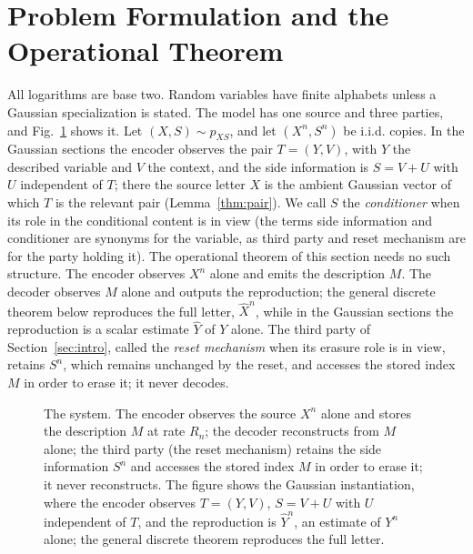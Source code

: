 \documentclass[11pt,onecolumn]{IEEEtran}
\newcommand{\hXn}{\widehat{X}^{n}}
\newcommand{\hY}{\widehat{Y}}
\begin{document}
\section{Problem Formulation and the Operational Theorem}
\label{sec:operational}

All logarithms are base two. Random variables have finite alphabets unless a
Gaussian specialization is stated. The model has one source and three
parties, and Fig.~\ref{fig:system} shows it. Let $(X,S)\sim p_{XS}$, and let
$(X^n,S^n)$ be i.i.d. copies. In the Gaussian sections the encoder observes
the pair $T=(Y,V)$, with $Y$ the described variable and $V$ the context, and
the side information is $S=V+U$ with $U$ independent of $T$; there the
source letter $X$ is the ambient Gaussian vector of which $T$ is the
relevant pair (Lemma~\ref{thm:pair}). We call $S$
the \emph{conditioner} when its role in the conditional content is in
view (the terms side information and conditioner are synonyms for the
variable, as third party and reset mechanism are for the party holding
it). The operational
theorem of this section needs no such structure. The encoder observes $X^n$
alone and emits the description $M$. The decoder observes $M$ alone and
outputs the reproduction; the general discrete theorem below reproduces the
full letter, $\hXn$, while in the Gaussian sections the reproduction is a
scalar estimate $\hY$ of $Y$ alone. The third party of
Section~\ref{sec:intro}, called the \emph{reset mechanism} when its
erasure role is in view, retains
$S^n$, which remains unchanged by the reset, and accesses the stored
index $M$ in order to erase it; it never decodes.

\begin{figure}[!t]
\centering
{}
\caption{The system. The encoder observes the source $X^n$ alone and stores
the description $M$ at rate $R_n$; the decoder reconstructs from $M$ alone;
the third party (the reset mechanism) retains the side information
$S^n$ and accesses the stored index $M$ in order to erase it; it never
reconstructs. The figure shows the Gaussian
instantiation, where the encoder observes $T=(Y,V)$, $S=V+U$ with $U$
independent of $T$, and
the reproduction is $\hY^n$, an estimate of $Y^n$ alone; the general
discrete theorem reproduces the full letter.}
\label{fig:system}
\end{figure}
\end{document}
